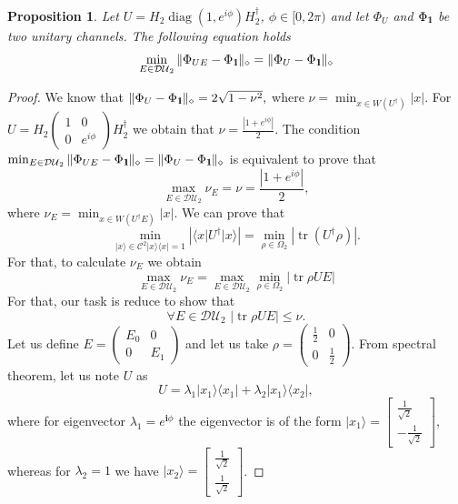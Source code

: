 \documentclass[11pt,a4paper,reqno, oneside]{amsart}
\DeclareMathOperator{\tr}{tr}
\DeclareMathOperator{\diag}{diag}
\newcommand{\ket}[1]{\ensuremath{|#1\rangle}}
\newcommand{\bra}[1]{\ensuremath{\langle#1|}}
\newcommand{\ketbra}[2]{\ensuremath{\ket{#1} \! \bra{#2}}}
\newcommand{\proj}[1]{\ensuremath{\ketbra{#1}{#1}}}
\newcommand{\1}{{\rm 1\hspace{-0.9mm}l}}
\newcommand{\Id}{{\rm 1\hspace{-0.9mm}l}}
\newcommand{\CC}{\mathcal{C}}
\newcommand{\diaguni}{\ensuremath{\mathcal{DU}}}
\newtheorem{proposition}{Proposition}
\begin{document}
\begin{proposition}
 Let $U = H_2 \diag(1, e^{i \phi}) H_2^\dagger$, $\phi \in [0, 2\pi)$ and	let 
 $\Phi_U$ and $\Phi_\Id$ be two unitary channels. The following equation holds 
	\begin{equation}
	\min_{E \in \diaguni_2} \|\Phi_{UE} - 
	\Phi_\Id\|_\diamond = \|\Phi_{U} - 
	\Phi_\Id\|_\diamond
	\end{equation}
\end{proposition}
\begin{proof} We know that
$
	\| \Phi_U  - \Phi_{\1} \|_\diamond = 2 \sqrt{1-\nu^2},
$
	where $\nu = \min_{x \in W(U^\dagger)} |x|  $. For $U = H_2 \left(\begin{array}{cc}1&0\\0&e^{i \phi}\end{array}\right)  H_2^\dagger$ we obtain that $\nu = \frac{|1 + e^{i \phi} | }{2}$. 
	The condition $ 	\min_{E \in \diaguni_2} \|\Phi_{UE} - 
	\Phi_\Id\|_\diamond = \|\Phi_{U} - 
	\Phi_\Id\|_\diamond $ is equivalent to prove that
	\begin{equation}
	\max_{E \in \diaguni_2 } \nu_E = \nu = \frac{|1 + e^{i \phi} | }{2},
	\end{equation}
	where $\nu_E = \min_{x \in W(U^\dagger E)} |x|. $ We can prove that
	\begin{equation}
	\min_{\ket{x} \in \CC^2  \proj{x} = 1} |\bra{x}U^\dagger\ket{x}| = \min_{\rho \in \Omega_2} |\tr(U^\dagger\rho)|. 
	\end{equation}
For that, to calculate $\nu_E$ we obtain \begin{equation}
	\max_{E \in \diaguni_2 } \nu_E  = \max_{E \in \diaguni_2 }  \min_{\rho \in \Omega_2} \left| \tr \rho U E  \right|
\end{equation}
For that, our task is reduce to show that
	\begin{equation}
	\forall E \in \diaguni_2 \,\, | \tr \rho U E | \le \nu. 
	\end{equation}
	Let us define $E = \left(\begin{array}{cc}E_0&0\\0&E_1\end{array}\right)  $ and let us take $\rho = \left(\begin{array}{cc}\frac{1}{2}&0\\0&\frac{1}{2}\end{array}\right) $. 
	From spectral theorem, let us note $U$ as
	\begin{equation}
	U= \lambda_1 \ketbra{x_1}{x_1} + \lambda_2 \ketbra{x_1}{x_2}, 
	\end{equation}
	where  for eigenvector $\lambda_1 = e^{\mathbf{i} \phi}$ the eigenvector is of the form $\ket{x_1} = \left[\begin{array}{c}\frac{1}{\sqrt{2}}\\-\frac{1}{\sqrt{2}}\end{array}\right]$, whereas for  $\lambda_2 = 1$ we have $\ket{x_2} = \left[\begin{array}{c}\frac{1}{\sqrt{2}}\\\frac{1}{\sqrt{2}}\end{array}\right]$.
	

\end{proof}
\end{document}
